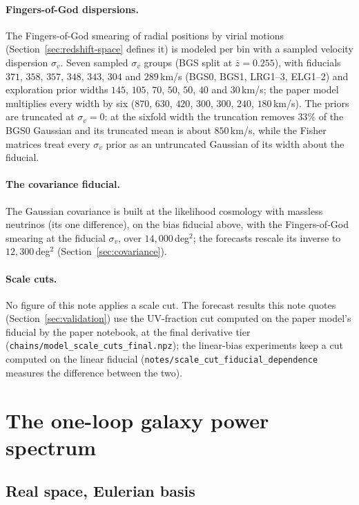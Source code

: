 \documentclass[11pt]{article}
\begin{document}
\paragraph{Fingers-of-God dispersions.}
The Fingers-of-God smearing of radial positions by virial motions
(Section~\ref{sec:redshift-space} defines it) is modeled per bin with
a sampled velocity dispersion $\sigma_v$.
Seven sampled $\sigma_v$ groups (BGS split at $\bar{z} = 0.255$), with
fiducials $371$, $358$, $357$, $348$, $343$, $304$ and $289$\,km/s
(BGS0, BGS1, LRG1--3, ELG1--2) and exploration prior widths $145$,
$105$, $70$, $50$, $50$, $40$ and $30$\,km/s; the paper model
multiplies every width by six ($870$, $630$, $420$, $300$, $300$,
$240$, $180$\,km/s).  The priors are truncated at $\sigma_v = 0$: at
the sixfold width the truncation removes $33\%$ of the BGS0 Gaussian
and its truncated mean is about $850$\,km/s, while the Fisher matrices
treat every $\sigma_v$ prior as an untruncated Gaussian of its width
about the fiducial.

\paragraph{The covariance fiducial.}
The Gaussian covariance is built at the likelihood cosmology with
massless neutrinos (its one difference), on the bias fiducial above,
with the Fingers-of-God smearing at the fiducial $\sigma_v$, over
$14{,}000$\,deg$^2$; the forecasts rescale its inverse to
$12{,}300$\,deg$^2$ (Section~\ref{sec:covariance}).

\paragraph{Scale cuts.}
No figure of this note applies a scale cut.  The forecast results this
note quotes (Section~\ref{sec:validation}) use the UV-fraction cut
computed on the paper model's fiducial by the paper notebook, at the
final derivative tier
(\texttt{chains/model\_scale\_cuts\_final.npz});
the linear-bias experiments keep a cut computed on the linear fiducial
(\texttt{notes/scale\_cut\_fiducial\_dependence} measures the
difference between the two).

\section{The one-loop galaxy power spectrum}
\label{sec:oneloop}

\subsection{Real space, Eulerian basis}
\label{sec:realspace}
\end{document}
